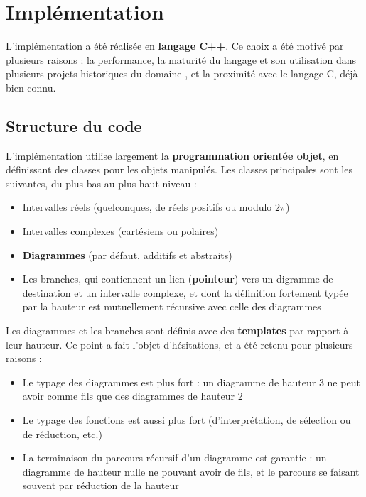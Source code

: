 
\chapter{Implémentation}
\label{ch:Implementation}

L’implémentation a été réalisée en \textbf{langage C++}. Ce choix a été motivé par plusieurs raisons : la performance, la maturité du langage et son utilisation dans plusieurs projets historiques du domaine \cite{Bichsel_2023}, et la proximité avec le langage C, déjà bien connu.

\section{Structure du code}

L'implémentation utilise largement la \textbf{programmation orientée objet}, en définissant des classes pour les objets manipulés. Les classes principales sont les suivantes, du plus bas au plus haut niveau :
\begin{itemize}
  \item Intervalles réels (quelconques, de réels positifs ou modulo $2\pi$)
  \item Intervalles complexes (cartésiens ou polaires)
  \item \textbf{Diagrammes} (par défaut, additifs et abstraits)
  \item Les branches, qui contiennent un lien (\textbf{pointeur}) vers un digramme de destination et un intervalle complexe, et dont la définition fortement typée par la hauteur est mutuellement récursive avec celle des diagrammes
\end{itemize}

Les diagrammes et les branches sont définis avec des \textbf{templates} par rapport à leur hauteur. Ce point a fait l'objet d'hésitations, et a été retenu pour plusieurs raisons :
\begin{itemize}
  \item Le typage des diagrammes est plus fort : un diagramme de hauteur 3 ne peut avoir comme fils que des diagrammes de hauteur 2
  \item Le typage des fonctions est aussi plus fort (d'interprétation, de sélection ou de réduction, etc.)
  \item La terminaison du parcours récursif d'un diagramme est garantie : un diagramme de hauteur nulle ne pouvant avoir de fils, et le parcours se faisant souvent par réduction de la hauteur
\end{itemize}

